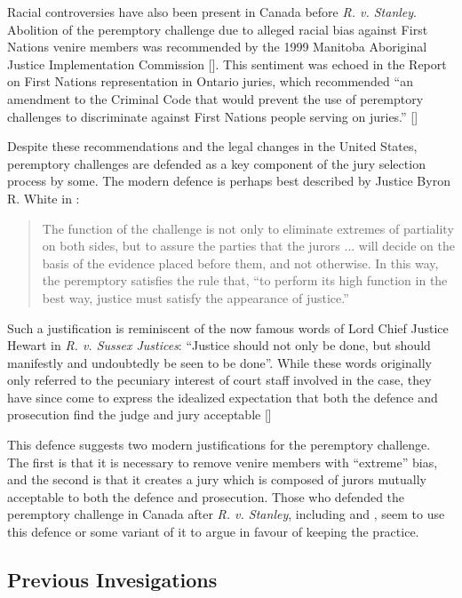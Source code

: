 Racial controversies have also been present in Canada before \textit{R. v. Stanley}. Abolition of the peremptory challenge due to alleged racial bias against First Nations
venire members was recommended by the 1999 Manitoba Aboriginal Justice Implementation Commission [\cite{MBajic}]. This sentiment was echoed in the \citeauthor{iacobuccireport} Report on First Nations representation in
Ontario juries, which recommended ``an amendment to the Criminal Code that would
prevent the use of peremptory challenges to discriminate against First
Nations people serving on juries.'' [\cite{iacobuccireport}]

Despite these recommendations and the legal changes in the United States, peremptory challenges are
defended as a key component of the jury selection process by some. The modern defence is perhaps best described by Justice Byron
R. White in \cite{swainvalabama}:

\begin{quote}
The function of the challenge is not only to eliminate extremes of partiality on both sides, but to assure the parties that the
jurors ... will decide on the basis of the evidence placed before them, and not otherwise. In this way,
the peremptory satisfies the rule that, ``to perform its high function in the best way, justice must satisfy the appearance of
justice.''
\end{quote}

Such a justification is reminiscent of the now famous words of Lord Chief Justice Hewart in \textit{R. v. Sussex Justices}:
``Justice should not only be done, but should manifestly and undoubtedly be seen to be done''. While these words originally only referred to the pecuniary interest of court staff involved in the case, they
have since come to express the idealized expectation that both the defence and prosecution find the judge and jury acceptable [\cite{oakes2016}]

This defence suggests two modern justifications for the peremptory challenge. The first is that it is necessary to remove venire members with
``extreme'' bias, and the second is that it creates a jury which is composed of jurors mutually acceptable to both the defence and prosecution. Those who defended the peremptory
challenge in Canada after \textit{R. v. Stanley}, including
\cite{peremparegood} and \cite{macnabproper}, seem to use this defence or some variant of it to argue in favour of keeping the
practice.

\subsection{Previous Invesigations} \label{sec:prevwork}

